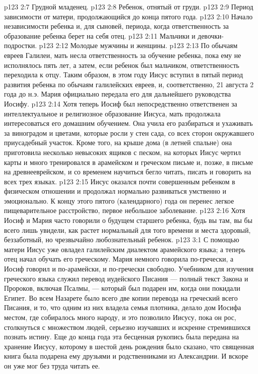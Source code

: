 \vs p123 2:7 \bibnobreakspace Грудной младенец.
\vs p123 2:8 \bibnobreakspace Ребенок, отнятый от груди.
\vs p123 2:9 \bibnobreakspace Период зависимости от матери, продолжающийся до конца пятого года.
\vs p123 2:10 \bibnobreakspace Начало независимости ребенка и, для сыновей, периода, когда ответственность за образование ребенка берет на себя отец.
\vs p123 2:11 \bibnobreakspace Мальчики и девочки\hyp{}подростки.
\vs p123 2:12 \bibnobreakspace Молодые мужчины и женщины.
\vs p123 2:13 \pc По обычаям евреев Галилеи, мать несла ответственность за обучение ребенка, пока ему не исполнялось пять лет, а затем, если ребенок был мальчиком, ответственность переходила к отцу. Таким образом, в этом году Иисус вступил в пятый период развития ребенка по обычаям галилейских евреев, и, соответственно, 21 августа 2 года до н.э. Мария официально передала его для дальнейшего руководства Иосифу.
\vs p123 2:14 Хотя теперь Иосиф был непосредственно ответственен за интеллектуальное и религиозное образование Иисуса, мать продолжала интересоваться его домашним обучением. Она учила его разбираться и ухаживать за виноградом и цветами, которые росли у стен сада, со всех сторон окружавшего приусадебный участок. Кроме того, на крыше дома (в летней спальне) она приготовила несколько невысоких ящиков с песком, на которых Иисус чертил карты и много тренировался в арамейском и греческом письме и, позже, в письме на древнееврейском, и со временем научиться бегло читать, писать и говорить на всех трех языках.
\vs p123 2:15 Иисус оказался почти совершенным ребенком в физическом отношении и продолжал нормально развиваться умственно и эмоционально. К концу этого пятого (календарного) года он перенес легкое пищеварительное расстройство, первое небольшое заболевание.
\vs p123 2:16 Хотя Иосиф и Мария часто говорили о будущем старшего ребенка, будь вы там, вы бы всего лишь увидели, как растет нормальный для того времени и места здоровый, беззаботный, но чрезвычайно любознательный ребенок.
\vs p123 3:1 С помощью матери Иисус уже овладел галилейским диалектом арамейского языка; а теперь отец начал обучать его греческому. Мария немного говорила по\hyp{}гречески, а Иосиф говорил и по\hyp{}арамейски, и по\hyp{}гречески свободно. Учебником для изучения греческого языка служил перевод иудейского Писания --- полный текст Закона и Пророков, включая Псалмы, --- который был подарен им, когда они покидали Египет. Во всем Назарете было всего две копии перевода на греческий всего Писания, и то, что одним из них владела семья плотника, делало дом Иосифа местом, где собиралось много народу, и это позволило Иисусу, пока он рос, столкнуться с множеством людей, серьезно изучавших и искренне стремившихся познать истину. Еще до конца года эта бесценная рукопись была передана на хранение Иисусу, которому в шестой день рождения было сказано, что священная книга была подарена ему друзьями и родственниками из Александрии. И вскоре он уже мог без труда читать ее.
